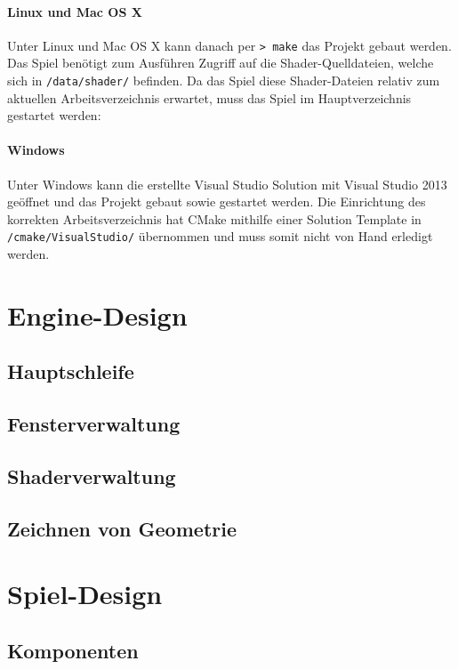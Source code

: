 \documentclass[12pt, a4paper, titlepage, hidelinks]{scrreprt}
\begin{document}
\paragraph{Linux und Mac OS X}
Unter Linux und Mac OS X kann danach per \texttt{>~make} das Projekt gebaut werden. Das Spiel benötigt zum Ausführen Zugriff auf die Shader-Quelldateien, welche sich in \texttt{/data/shader/} befinden. Da das Spiel diese Shader-Dateien relativ zum aktuellen Arbeitsverzeichnis erwartet, muss das Spiel im Hauptverzeichnis gestartet werden:

\paragraph{Windows}
Unter Windows kann die erstellte Visual Studio Solution mit Visual Studio 2013 geöffnet und das Projekt gebaut sowie gestartet werden. Die Einrichtung des korrekten Arbeitsverzeichnis hat CMake mithilfe einer Solution Template in \texttt{/cmake/VisualStudio/} übernommen und muss somit nicht von Hand erledigt werden.

\section{Engine-Design}
\subsection{Hauptschleife}


\subsection{Fensterverwaltung}
\subsection{Shaderverwaltung}
\subsection{Zeichnen von Geometrie}


\section{Spiel-Design}
\subsection{Komponenten}
\end{document}
